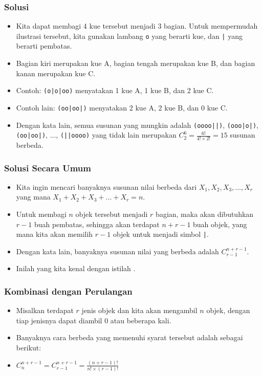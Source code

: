 \begin{frame}
\frametitle{Solusi}
\begin{itemize}
  \item Kita dapat membagi 4 kue tersebut menjadi 3 bagian. Untuk mempermudah ilustrasi tersebut, kita gunakan lambang \texttt{o} yang berarti kue, dan \texttt{|} yang berarti pembatas.
  \item Bagian kiri merupakan kue A, bagian tengah merupakan kue B, dan bagian kanan merupakan kue C.
  \item Contoh: \texttt{(o|o|oo)} menyatakan 1 kue A, 1 kue B, dan 2 kue C.
  \item Contoh lain: \texttt{(oo|oo|)} menyatakan 2 kue A, 2 kue B, dan 0 kue C.
  \item Dengan kata lain, semua susunan yang mungkin adalah \texttt{(oooo||)}, \texttt{(ooo|o|)}, \texttt{(oo|oo|)}, ..., \texttt{(||oooo)} yang tidak lain merupakan $C^{6}_{2} = \frac{6!}{4! \times 2!} = 15$ susunan berbeda.
\end{itemize}
\end{frame}

\begin{frame}
\frametitle{Solusi Secara Umum}
\begin{itemize}
  \item Kita ingin mencari banyaknya susunan nilai berbeda dari $X_{1}, X_{2}, X_{3}, ..., X_{r}$ yang mana $X_{1} + X_{2} + X_{3} + ... + X_{r} = n$.
  \item Untuk membagi $n$ objek tersebut menjadi $r$ bagian, maka akan dibutuhkan $r-1$ buah pembatas, sehingga akan terdapat $n+r-1$ buah objek, yang mana kita akan memilih $r-1$ objek untuk menjadi simbol \texttt{|}.
  \item Dengan kata lain, banyaknya susunan nilai yang berbeda adalah $C^{n+r-1}_{r-1}$.
  \item Inilah yang kita kenal dengan istilah .
\end{itemize}
\end{frame}

\begin{frame}
\frametitle{Kombinasi dengan Perulangan}
\begin{itemize}
  \item Misalkan terdapat $r$ jenis objek dan kita akan mengambil $n$ objek, dengan tiap jenisnya dapat diambil 0 atau beberapa kali.
  \item Banyaknya cara berbeda yang memenuhi syarat tersebut adalah sebagai berikut:
  \item $C^{n+r-1}_{n} = C^{n+r-1}_{r-1} = \frac{(n+r-1)!}{n! \times (r-1)!}$
\end{itemize}
\end{frame}

